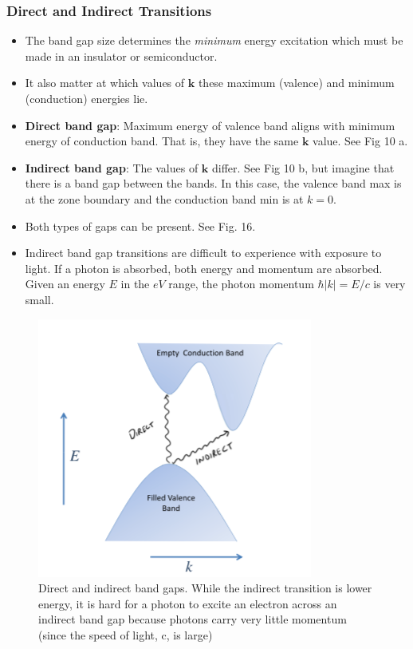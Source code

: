 \documentclass[10pt]{article}
\begin{document}
\subsubsection{Direct and Indirect Transitions}
\begin{itemize}
  \item The band gap size determines the \emph{minimum} energy excitation which must be made in an insulator or semiconductor.
  \item It also matter at which values of $\textbf{k}$ these maximum (valence) and minimum (conduction) energies lie.
  \item \textbf{Direct band gap}: Maximum energy of valence band aligns with minimum energy of conduction band. That is, they have the same
  $\textbf{k}$ value. See Fig 10 a.
  \item \textbf{Indirect band gap}: The values of $\textbf{k}$ differ. See Fig 10 b, but imagine that there is a band gap between the bands. In this case,
  the valence band max is at the zone boundary and the conduction band min is at $k = 0$.
  \item Both types of gaps can be present. See Fig. 16.
  \item Indirect band gap transitions are difficult to experience with exposure to light. If a photon is absorbed, both energy and momentum are absorbed. Given
  an energy $E$ in the $eV$ range, the photon momentum $\hbar|k| = E/c$ is very small.
\end{itemize}

\begin{figure}
  \centering
    \includegraphics[width=\textwidth]{tb16}
    \caption{Direct and indirect band gaps. While the indirect transition is lower energy, it is hard for a photon to excite an
    electron across an indirect band gap because photons carry very little momentum (since the speed of light, c, is large)}
\end{figure}
\end{document}
